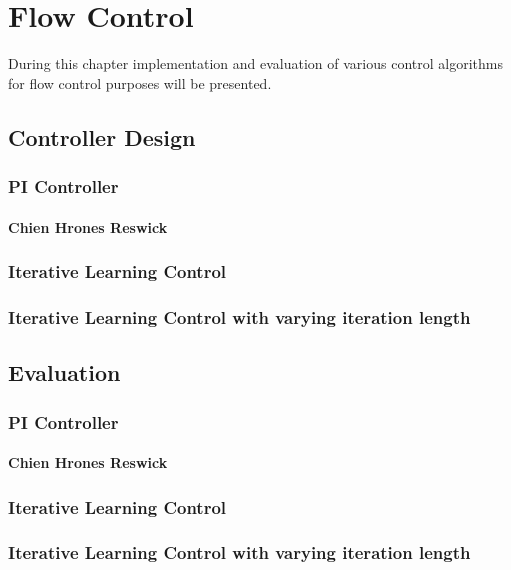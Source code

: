 \chapter{Flow Control}
During this chapter implementation and evaluation of various control algorithms for flow control purposes will be presented. 
\section{Controller Design}
\subsection{PI Controller}
\subsubsection{Chien Hrones Reswick}
\subsection{Iterative Learning Control}
\subsection{Iterative Learning Control with varying iteration length}

\section{Evaluation}
\subsection{PI Controller}
\subsubsection{Chien Hrones Reswick}
\subsection{Iterative Learning Control}
\subsection{Iterative Learning Control with varying iteration length}
%
%
